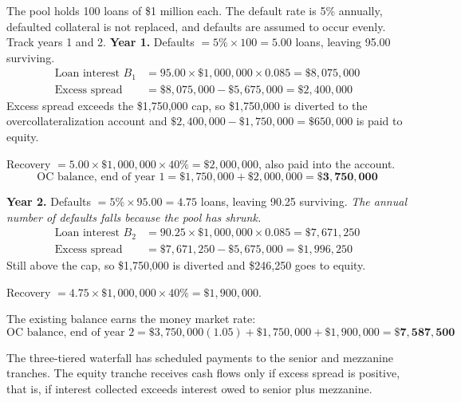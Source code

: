 \begin{crexbox}
The pool holds 100 loans of \$1 million each. The default rate is 5\% annually,
defaulted collateral is not replaced, and defaults are assumed to occur evenly.
Track years 1 and 2.
\tcblower
\textbf{Year 1.} Defaults $= 5\% \times 100 = 5.00$ loans, leaving 95.00
surviving.
\begin{align*}
\text{Loan interest } B_1 &= 95.00 \times \$1{,}000{,}000 \times 0.085
  = \$8{,}075{,}000 \\
\text{Excess spread} &= \$8{,}075{,}000 - \$5{,}675{,}000 = \$2{,}400{,}000
\end{align*}
Excess spread exceeds the \$1,750,000 cap, so \$1,750,000 is diverted to the
overcollateralization account and $\$2{,}400{,}000 - \$1{,}750{,}000 =
\$650{,}000$ is paid to equity.

Recovery $= 5.00 \times \$1{,}000{,}000 \times 40\% = \$2{,}000{,}000$, also paid
into the account.
\[ \text{OC balance, end of year 1} = \$1{,}750{,}000 + \$2{,}000{,}000
   = \mathbf{\$3{,}750{,}000} \]

\smallskip
\textbf{Year 2.} Defaults $= 5\% \times 95.00 = 4.75$ loans, leaving 90.25
surviving. \emph{The annual number of defaults falls because the pool has
shrunk.}
\begin{align*}
\text{Loan interest } B_2 &= 90.25 \times \$1{,}000{,}000 \times 0.085
  = \$7{,}671{,}250 \\
\text{Excess spread} &= \$7{,}671{,}250 - \$5{,}675{,}000 = \$1{,}996{,}250
\end{align*}
Still above the cap, so \$1,750,000 is diverted and \$246,250 goes to equity.

Recovery $= 4.75 \times \$1{,}000{,}000 \times 40\% = \$1{,}900{,}000$.

The existing balance earns the money market rate:
\[ \text{OC balance, end of year 2}
   = \$3{,}750{,}000 (1.05) + \$1{,}750{,}000 + \$1{,}900{,}000
   = \mathbf{\$7{,}587{,}500} \]
\end{crexbox}


The three-tiered waterfall has scheduled payments to the senior and mezzanine
tranches. The equity tranche receives cash flows only if excess spread is positive,
that is, if interest collected exceeds interest owed to senior plus mezzanine.

